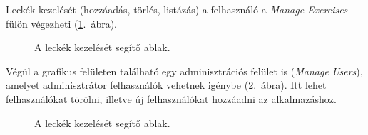 \documentclass[11pt, a4paper]{article}
\begin{document}
     Leckék kezelését (hozzáadás, törlés, listázás) a felhasználó a \emph{Manage Exercises} fülön végezheti (\ref{fig:manage-exercises}.~ábra).
     \begin{figure}[htbp]
     	\center
     	\caption{A leckék kezelését segítő ablak.}
     	\label{fig:manage-exercises}
     \end{figure}
     Végül a grafikus felületen található egy adminisztrációs felület is (\emph{Manage Users}), amelyet adminisztrátor felhasználók vehetnek igénybe (\ref{fig:manage-users}.~ábra). Itt lehet felhasználókat törölni, illetve új felhasználókat hozzáadni az alkalmazáshoz.
     \begin{figure}[htbp]
     	\center
     	\caption{A leckék kezelését segítő ablak.}
     	\label{fig:manage-users}
     \end{figure}
   
\end{document}
